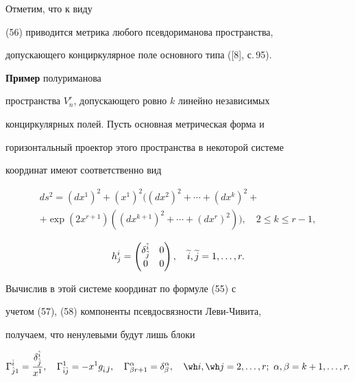 \begin{note}


Отметим, что к виду


(56) приводится метрика любого псевдориманова пространства,


допускающего конциркулярное поле основного типа ([8], с.\,95).


\end{note}





{\bf Пример} полуриманова


пространства $V^r_n$, допускающего ровно $k$ линейно независимых


конциркулярных полей. Пусть основная метрическая форма и


горизонтальный проектор этого пространства в некоторой системе


координат имеют соответственно вид


\begin{multline}


ds^2=(dx^{1})^2 +(x^{1})^2((dx^{2})^2+\dotsb +(dx^{k})^2 +\\


+ \exp ({ 2x^{r+1}})


((dx^{k+1})^2+\dotsb +(dx^{r})^2)),\quad 2\le k \le r-1,


\end{multline}


\begin{equation}


h_{j}^i=\begin{pmatrix}


{\de}_{\Tilde j}^{\Tilde i} & 0 \\


0 & 0


\end{pmatrix}, \quad \ti i, \ti j=1,\ds,r.


\end{equation}


Вычислив в этой системе координат по формуле (55) с


учетом (57), (58) компоненты псевдосвязности Леви-Чивита,


получаем, что ненулевыми будут лишь блоки


\begin{equation}


{\Ga}^{\Hat i}_{\Hat {j}1}=\frac { {\de}_{\Hat j}^{\Hat


i}}{x^1},\quad{\Ga}^1_{{\Hat i}\Hat {j}}=-{x^1}g_{{\Hat


i}\Hat {J}},\quad {\Ga}^{\a}_{\be r+1}={ \de}_{\be}^{\a},\quad


\wh i, \wh j=2,\ds, r ; \ \a,\be=k+1,\ds, r.


\end{equation}


